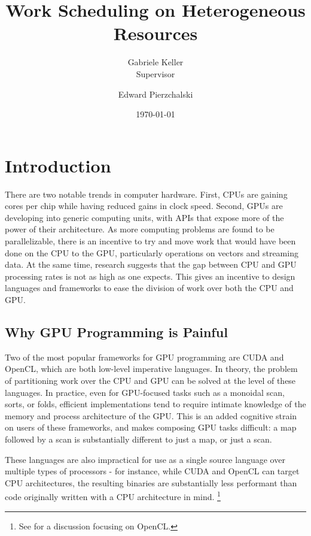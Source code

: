 \documentclass[a4paper,12pt]{article}
\title{Work Scheduling on Heterogeneous Resources}
\date{\today}
\author{Gabriele Keller\\\small{Supervisor} \and Edward Pierzchalski}
\begin{document}
\begin{titlepage}

\cleardoublepage
\maketitle
\thispagestyle{empty}

\end{titlepage}

\section{Introduction}
There are two notable trends in computer hardware. 
First, CPUs are gaining cores per chip while having reduced gains in clock speed. 
Second, GPUs are developing into generic computing units, with APIs that expose more of the power of their architecture.
As more computing problems are found to be parallelizable, there is an incentive to try and move work that would have been done on the CPU to the GPU, particularly operations on vectors and streaming data.
At the same time, research suggests that the gap between CPU and GPU processing rates is not as high as one expects. \citep{lee_debunking_2010, gregg_where_2011}
This gives an incentive to design languages and frameworks to ease the division of work over both the CPU and GPU.

\subsection{Why GPU Programming is Painful}
Two of the most popular frameworks for GPU programming are CUDA and OpenCL, which are both low-level imperative languages. 
In theory, the problem of partitioning work over the CPU and GPU can be solved at the level of these languages. 
In practice, even for GPU-focused tasks such as a monoidal scan, sorts, or folds, efficient implementations tend to require intimate knowledge of the memory and process architecture of the GPU. \citet{harris_parallel_2007, satish_designing_2008}
This is an added cognitive strain on users of these frameworks, and makes composing GPU tasks difficult: a map followed by a scan is substantially different to just a map, or just a scan.

These languages are also impractical for use as a single source language over multiple types of processors - for instance, while CUDA and OpenCL can target CPU architectures, the resulting binaries are substantially less performant than code originally written with a CPU architecture in mind. \footnote{See \citet{jie_shen_performance_2013} for a discussion focusing on OpenCL.}
\end{document}
